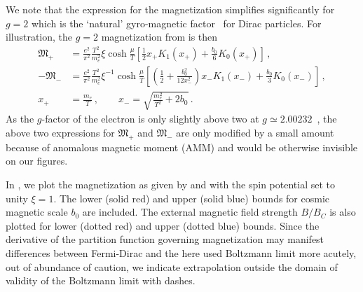 We note that the expression for the magnetization simplifies significantly for $g\!=\!2$ which is the `natural' gyro-magnetic factor~\cite{Evans:2022fsu,Rafelski:2022bsv} for Dirac particles. For illustration, the $g\!=\!2$ magnetization from  is then
\begin{align}
 \label{g2magplus}
 {\mathfrak M}_{+}&=\frac{e^{2}}{\pi^{2}}\frac{T^{2}}{m_{e}^{2}}\xi\cosh{\frac{\mu}{T}}\left[\frac{1}{2}x_{+}K_{1}(x_{+})+\frac{b_{0}}{6}K_{0}(x_{+})\right]\,,\\
 \label{g2magminus}
 -{\mathfrak M}_{-}&=\frac{e^{2}}{\pi^{2}}\frac{T^{2}}{m_{e}^{2}}\xi^{-1}\cosh{\frac{\mu}{T}}
 \left[\left(\frac{1}{2}+\frac{b_{0}^{2}}{12x_{-}^{2}}\right)x_{-}K_{1}(x_{-})+\frac{b_{0}}{3}K_{0}(x_{-})\right]\,,\\
 x_{+}&=\frac{m_{e}}{T}\,,\qquad
 x_{-}=\sqrt{\frac{m_{e}^{2}}{T^{2}}+2b_{0}}\,.
\end{align}
As the $g$-factor of the electron is only slightly above two at $g\simeq2.00232$~\cite{Tiesinga:2021myr}, the above two expressions for ${\mathfrak M}_{+}$ and ${\mathfrak M}_{-}$ are only modified by a small amount because of anomalous magnetic moment (AMM) and would be otherwise invisible on our figures.

\label{sec:paramagnetism}
\noindent In , we plot the magnetization as given by  and  with the spin potential set to unity $\xi=1$. The lower (solid red) and upper (solid blue) bounds for cosmic magnetic scale $b_{0}$ are included. The external magnetic field strength ${B}/{B}_{C}$ is also plotted for lower (dotted red) and upper (dotted blue) bounds. Since the derivative of the partition function governing magnetization may manifest differences between Fermi-Dirac and the here used Boltzmann limit more acutely, out of abundance of caution, we indicate extrapolation outside the domain of validity of the Boltzmann limit with dashes.

